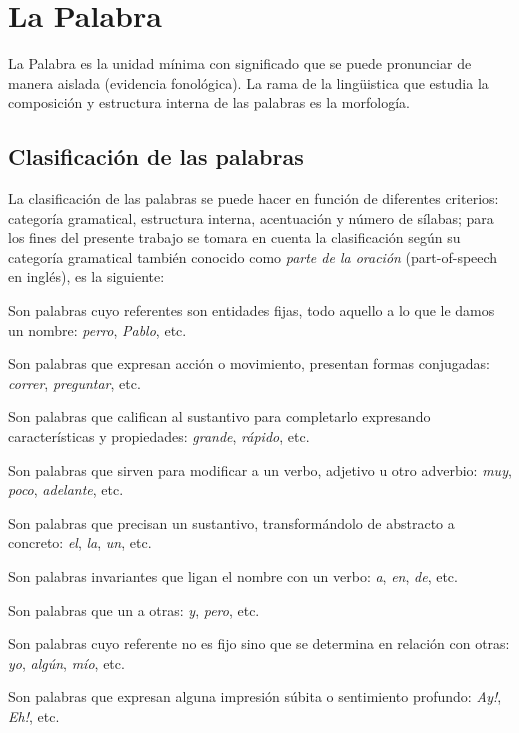 \section{La Palabra}
La Palabra es la unidad m\'inima con significado que se puede pronunciar de manera
aislada (evidencia fonol\'ogica)\cite{HOET09}. La rama de la ling\"uistica que estudia
la composici\'on y estructura interna de las palabras es la morfolog\'ia.


\subsection{Clasificaci\'on de las palabras}
La clasificaci\'on de las palabras se puede hacer en funci\'on de diferentes criterios:
categor\'ia gramatical, estructura interna, acentuaci\'on y n\'umero de s\'ilabas; para
los fines del presente trabajo se tomara en cuenta la clasificaci\'on seg\'un su
categor\'ia gramatical tambi\'en conocido como \emph{parte de la oraci\'on}
(part-of-speech en ingl\'es), es la siguiente:
\begin{description}[leftmargin=0cm]
	\item[Sustantivo] Son palabras cuyo referentes son entidades fijas, todo aquello a 
	lo que le damos un nombre: \emph{perro}, \emph{Pablo}, etc.
	\item[Verbo] Son palabras que expresan acci\'on o movimiento, presentan formas
	conjugadas: \emph{correr}, \emph{preguntar}, etc.
	\item[Adjetivo] Son palabras que califican al sustantivo para completarlo expresando
	caracter\'isticas y propiedades: \emph{grande}, \emph{r\'apido}, etc.
	\item[Adverbio] Son palabras que sirven para modificar a un verbo, adjetivo u otro
	adverbio: \emph{muy}, \emph{poco}, \emph{adelante}, etc.
	\item[Determinante] Son palabras que precisan un sustantivo, transform\'andolo de
	abstracto a concreto: \emph{el}, \emph{la}, \emph{un}, etc.
	\item[Preposici\'on] Son palabras invariantes que ligan el nombre con un verbo:
	\emph{a}, \emph{en}, \emph{de}, etc.
	\item[Conjunci\'on] Son palabras que un a otras: \emph{y}, \emph{pero}, etc.
	\item[Pronombre] Son palabras cuyo referente no es fijo sino que se determina
	en relaci\'on con otras: \emph{yo}, \emph{alg\'un}, \emph{m\'io}, etc.
	\item[Interjecci\'on] Son palabras que expresan alguna impresi\'on s\'ubita o
	sentimiento profundo: \emph{Ay!}, \emph{Eh!}, etc.
\end{description}

